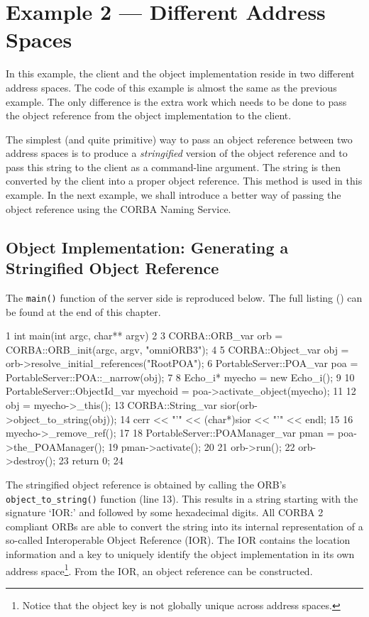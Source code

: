 \documentclass[11pt,twoside,a4paper]{book}
\newcommand{\op}[1]{\texttt{#1()}}
\newcommand{\term}[1]{\textit{#1}}
\newcommand{\file}{\begingroup \urlstyle{tt}\Url}
\newcommand{\dsc}{\discretionary{}{}{}}
\begin{document}
\section{Example 2 --- Different Address Spaces}

In this example, the client and the object implementation reside in
two different address spaces. The code of this example is almost the
same as the previous example. The only difference is the extra work
which needs to be done to pass the object reference from the object
implementation to the client.

The simplest (and quite primitive) way to pass an object reference
between two address spaces is to produce a \term{stringified} version
of the object reference and to pass this string to the client as a
command-line argument.  The string is then converted by the client
into a proper object reference.  This method is used in this
example. In the next example, we shall introduce a better way of
passing the object reference using the CORBA Naming Service.

\subsection{Object Implementation: Generating a Stringified Object Reference}

The \op{main} function of the server side is reproduced below. The
full listing (\file{eg2_impl.cc}) can be found at the end of this
chapter.

\lstset{labelstep=1,gobble=4}
\begin{cxxlisting}
 1  int main(int argc, char** argv)
 2  {
 3    CORBA::ORB_var orb = CORBA::ORB_init(argc, argv, "omniORB3");
 4
 5    CORBA::Object_var       obj = orb->resolve_initial_references("RootPOA");
 6    PortableServer::POA_var poa = PortableServer::POA::_narrow(obj);
 7
 8    Echo_i* myecho = new Echo_i();
 9
10    PortableServer::ObjectId_var myechoid = poa->activate_object(myecho);
11
12    obj = myecho->_this();
13    CORBA::String_var sior(orb->object_to_string(obj));
14    cerr << "'" << (char*)sior << "'" << endl;
15
16    myecho->_remove_ref();
17
18    PortableServer::POAManager_var pman = poa->the_POAManager();
19    pman->activate();
20
21    orb->run();
22    orb->destroy();
23    return 0;
24  }
\end{cxxlisting}
\lstset{labelstep=0,gobble=0}

The stringified object reference is obtained by calling the ORB's
\op{object\_to\_\dsc{}string} function (line 13). This results in a
string starting with the signature `IOR:' and followed by some
hexadecimal digits. All CORBA 2 compliant ORBs are able to convert the
string into its internal representation of a so-called Interoperable
Object Reference (IOR). The IOR contains the location information and
a key to uniquely identify the object implementation in its own
address space\footnote{Notice that the object key is not globally
unique across address spaces.}. From the IOR, an object reference can
be constructed.
\end{document}
